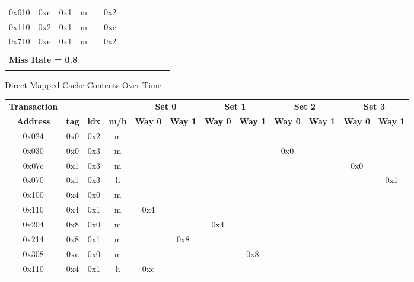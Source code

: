 \documentclass[10pt]{article}
\begin{document}
\begin{figure}[H]
\begin{tabular}{@{\extracolsep{3pt}}cccccccccccc@{}}
0x610 & 0xc & 0x1 & m &     & 0x2 &     &     &     &     &     &     \\
0x110 & 0x2 & 0x1 & m &     & 0xc &     &     &     &     &     &     \\
0x710 & 0xe & 0x1 & m &     & 0x2 &     &     &     &     &     &     \\
\Xhline{2\arrayrulewidth}
\multicolumn{12}{l}{\textbf{Number of Misses = 16}} \\
\hline
\multicolumn{12}{l}{\textbf{Miss Rate = 0.8}} \\
\Xhline{2\arrayrulewidth}
\end{tabular}
\caption{Direct-Mapped Cache Contents Over Time}
\end{figure}

\begin{figure}[H]
\centering
\begin{tabular}{@{\extracolsep{3pt}}cccccccccccc@{}}
\Xhline{2\arrayrulewidth}
\textbf{Transaction} & & & & \multicolumn{2}{c}{\textbf{Set 0}} & \multicolumn{2}{c}{\textbf{Set 1}} & \multicolumn{2}{c}{\textbf{Set 2}} & \multicolumn{2}{c}{\textbf{Set 3}} \\
\cline{5-6}
\cline{7-8}
\cline{9-10}
\cline{11-12}
\textbf{Address} & \textbf{tag} & \textbf{idx} & \textbf{m/h} & \textbf{Way 0} & \textbf{Way 1} & \textbf{Way 0} & \textbf{Way 1} & \textbf{Way 0} & \textbf{Way 1} & \textbf{Way 0} & \textbf{Way 1} \\
\Xhline{2\arrayrulewidth}
0x024 & 0x0 & 0x2 & m &  -  &  -  &  -  &  -  &  -  &  -  &  -  &  -  \\
0x030 & 0x0 & 0x3 & m &     &     &     &     & 0x0 &     &     &     \\
0x07c & 0x1 & 0x3 & m &     &     &     &     &     &     & 0x0 &     \\
0x070 & 0x1 & 0x3 & h &     &     &     &     &     &     &     & 0x1 \\
0x100 & 0x4 & 0x0 & m &     &     &     &     &     &     &     &     \\
0x110 & 0x4 & 0x1 & m & 0x4 &     &     &     &     &     &     &     \\
0x204 & 0x8 & 0x0 & m &     &     & 0x4 &     &     &     &     &     \\
0x214 & 0x8 & 0x1 & m &     & 0x8 &     &     &     &     &     &     \\
0x308 & 0xc & 0x0 & m &     &     &     & 0x8 &     &     &     &     \\
0x110 & 0x4 & 0x1 & h & 0xc &     &     &     &     &     &     &     \\

\end{tabular}
\end{figure}
\end{document}
